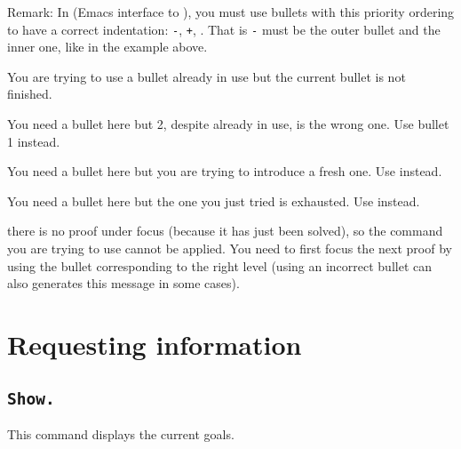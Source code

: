 Remark: In {\ProofGeneral} (Emacs interface to {\Coq}), you must use bullets
with this priority ordering to have a correct indentation: {\tt -},
{\tt +}, {\tt *}. That is {\tt -} must be the outer bullet and {\tt *}
the inner one, like in the example above.

\begin{ErrMsgs}
\item {} You are trying to use a bullet already in use
  but the current bullet {\abullet} is not finished.

\item {} You need a bullet here but {\abullet}2,
  despite already in use, is the wrong one. Use bullet {\abullet}1
  instead.

\item {} You need a bullet here but you are trying to
  introduce a fresh one. Use {\abullet} instead.

\item {} You need a bullet here but the one you just
  tried is exhausted. Use {\abullet} instead.

\item {} there is no proof under focus
  (because it has just been solved), so the command you are trying
  to use cannot be applied. You need to first focus the next proof
  by using the bullet corresponding to the right level (using an
  incorrect bullet can also generates this message in some cases).


\end{ErrMsgs}


\section{Requesting information}

\subsection[\tt Show.]{\tt Show.\label{Show}}
This command displays the current goals.

